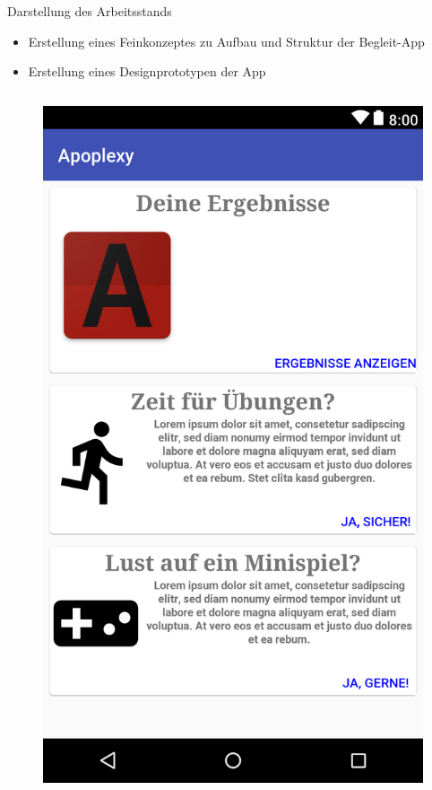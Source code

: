 \documentclass[hyphens]{beamer}
\begin{document}
 \begin{frame}{Darstellung des Arbeitsstands}
 \begin{itemize}
 \item Erstellung eines Feinkonzeptes zu Aufbau und Struktur der Begleit-App
 \item Erstellung eines Designprototypen der App
 \end{itemize}
 \begin{columns}[T]
  \begin{column}{0.5\textwidth}
  \begin{figure}
  \includegraphics[scale=0.05]{img/layout-home}

\end{figure}
\end{column}
\end{columns}
\end{frame}
\end{document}
